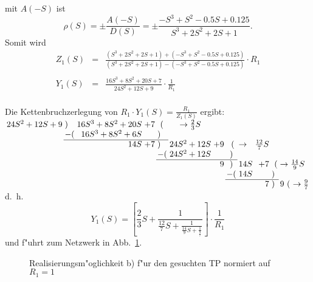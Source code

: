  mit $A(-S)$ ist \[
\rho(S)=\pm \frac{A(-S)}{D(S)}=\pm \frac{- S^3 + S^2-0.5 S + 0.125}
                                            {S^3 + 2 S^2 + 2 S + 1}. 
\]
\nit Somit wird
\begin{eqnarray*}
Z_1(S) &=& \frac{(S^3 + 2 S^2 + 2 S + 1) + (- S^3 + S^2-0.5 S + 0.125)}
  {(S^3 + 2 S^2 + 2 S + 1)-(- S^3 + S^2-0.5 S + 0.125)} \cdot R_1 \\
&&\\
Y_1(S) &=& \frac{16 S^3 + 8 S^2 + 20 S + 7}{24 S^2 + 12 S + 9} \cdot 
  \frac{1}{R_1}
\end{eqnarray*}\\
\nit Die Kettenbruchzerlegung von $R_1 \cdot Y_1(S)=\frac{R_1}{Z_1(S)}$ ergibt:\\
$
\setlength{\arraycolsep}{0.3\arraycolsep}
\begin{array}{rlrclcrclrll}
24S^2+12S+9&)&16S^3+8S^2+20S&+7&~(& \rightarrow \frac{2}{3} S &&&&&&\\
   &-(&16S^3+8S^2+6S&  &) &&&&&&&\\ \cline{2-5}
      && 14S&+7&) &24S^2+12S&+9&~(& \rightarrow &\frac{12}{7} S&&\\
         &&&&-(&24S^2+12S&  &) &&&&\\ \cline{5-8}
            &&&&&&  9&) &14S&+7&~(&\rightarrow \frac{14}{9} S\\
               &&&&&&&-(&14S&  &) & \\ \cline{8-11}
                  &&&&&&&&& 7&) &9 ~( ~\rightarrow \frac{9}{7}
\end{array}$\\
\nit d.~h.
\[
Y_{1}(S)=
[\frac{2}{3}S+
\displaystyle\frac{1}{
\displaystyle\frac{12}{7}S+
\displaystyle\frac{1}{
\displaystyle\frac{14}{9}S+
\displaystyle\frac{1}{
\displaystyle\frac{9}{7}}}}]\cdot\frac{1}{R_{1}} 
\]
\nit und f"uhrt zum Netzwerk in Abb.~\ref{real-b}.\\
\begin{figure}[!htb]
\vspace*{-6mm}
\begin{center}
  \vspace*{-3mm}\caption{Realisierungsm"oglichkeit b) f"ur den gesuchten TP normiert auf 
  $R_1=1$ \label{real-b}}
\end{center}
\vspace*{-6mm}
\end{figure}\\

